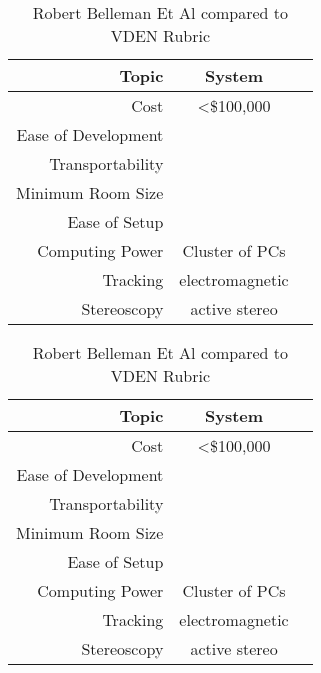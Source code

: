 \filbreak
{}

\begin{table}[H]
	\centering
	\renewcommand\arraystretch{0.5}
	\begin{tabular}{r|c|c}
		\hline 
		Topic & System &  \\ 
		\hline 
		Cost 				& \textless \$100,000 	& \cross \\ 
		Ease of Development & \ns 					& \cross \\ 
		Transportability 	& \ns  					& \cross \\ 
		Minimum Room Size 	& \ns 					& \cross \\ 
		Ease of Setup 		& \ns 					& \cross \\ 
		Computing Power 	& Cluster of PCs 		& \cross \\ 
		Tracking 			& electromagnetic 		& \cross \\ 
		Stereoscopy 		& active stereo 		& \checkmark \\
		\hline 
	\end{tabular} 
	
	\caption{Robert Belleman Et Al compared to VDEN Rubric} \label{tab:stifdsamuli}
\end{table}

\filbreak
{}

\begin{table}[H]
	\centering
	\renewcommand\arraystretch{0.5}
	\begin{tabular}{r|c|c}
		\hline 
		Topic & System &  \\
		\hline 
		Cost 				& \textless \$100,000 	& \cross \\ 
		Ease of Development & \ns 					& \cross \\ 
		Transportability 	& \ns  					& \cross \\ 
		Minimum Room Size 	& \ns 					& \cross \\ 
		Ease of Setup 		& \ns 					& \cross \\ 
		Computing Power 	& Cluster of PCs 		& \cross \\ 
		Tracking 			& electromagnetic 		& \cross \\ 
		Stereoscopy 		& active stereo 		& \checkmark \\
		\hline 
	\end{tabular} 
	
	\caption{Robert Belleman Et Al compared to VDEN Rubric} \label{tab:stifdsamuli}
\end{table}

